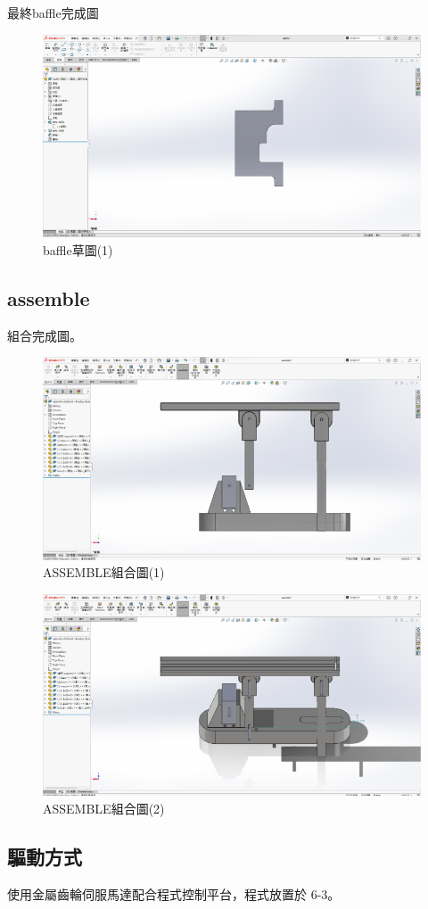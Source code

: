 最終baffle完成圖

\begin{figure}[htbp]
    \centering
    \includegraphics[width=1\textwidth]{./../images/螢幕擷取畫面 2024-05-25 230234}
    \caption{baffle草圖(1)}
\end{figure}

\subsection*{assemble}

組合完成圖。

\begin{figure}[htbp]
    \centering
    \includegraphics[width=1\textwidth]{./../images/6-1-45}
    \caption{ASSEMBLE組合圖(1)}
\end{figure}

\begin{figure}[htbp]
    \centering
    \includegraphics[width=1\textwidth]{./../images/6-1-46}
    \caption{ASSEMBLE組合圖(2)}
\end{figure}


\subsection*{驅動方式}

使用金屬齒輪伺服馬達配合程式控制平台，程式放置於 6-3。

